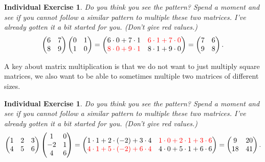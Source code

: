 \documentclass[10pt,reqno]{amsart}
\newtheorem{individualExercise}[lemma]{Individual Exercise}
\theoremstyle{remark}
\begin{document}
\begin{individualExercise}
Do you think you see the pattern? Spend a moment and see if you cannot follow a similar pattern to multiple these two matrices. I've already gotten it a bit started for you. (Don't give red values.)
\[
\begin{pmatrix}
6 & 7 \\
8 & 9
\end{pmatrix}
\begin{pmatrix}
0 & 1 \\
1 & 0\\
\end{pmatrix}
=
\begin{pmatrix}
6 \cdot 0 + 7 \cdot 1 & {\color{red} 6 \cdot 1 + 7 \cdot 0} \\
{\color{red} 8 \cdot 0 + 9 \cdot 1} & 8 \cdot 1 + 9 \cdot 0 
\end{pmatrix}=
\begin{pmatrix}
7 & 6 \\
9 & 8
\end{pmatrix}.
\]
\end{individualExercise}

A key about matrix multiplication is that we do not want to just multiply square matrices, we also want to be able to sometimes multiple two matrices of different sizes. 

\begin{individualExercise}
Do you think you see the pattern? Spend a moment and see if you cannot follow a similar pattern to multiple these two matrices. I've already gotten it a bit started for you. (Don't give red values.)
\[
\begin{pmatrix}
1 & 2 & 3 \\
4 & 5 & 6
\end{pmatrix}
\begin{pmatrix}
1 & 0 \\
-2 & 1\\
4 & 6 \\
\end{pmatrix}
=
\begin{pmatrix}
1\cdot 1 + 2\cdot (-2) + 3\cdot 4 & {\color{red}1\cdot 0 + 2\cdot 1 + 3\cdot  6} \\
{\color{red}4\cdot 1 + 5\cdot (-2) + 6\cdot 4} & 4\cdot 0 + 5\cdot 1 + 6\cdot  6
\end{pmatrix}=
\begin{pmatrix}
9 & 20 \\
18 & 41
\end{pmatrix}.
\]
\end{individualExercise}
\end{document}
